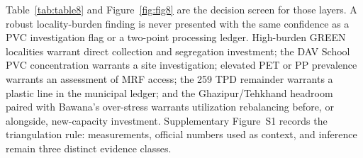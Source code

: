 \documentclass[12pt,a4paper]{article}
\begin{document}
Table~\ref{tab:table8} and Figure~\ref{fig:fig8} are the decision screen for those layers. A robust locality-burden finding is never presented with the same confidence as a PVC investigation flag or a two-point processing ledger. High-burden GREEN localities warrant direct collection and segregation investment; the DAV School PVC concentration warrants a site investigation; elevated PET or PP prevalence warrants an assessment of MRF access; the 259 TPD remainder warrants a plastic line in the municipal ledger; and the Ghazipur/Tehkhand headroom paired with Bawana's over-stress warrants utilization rebalancing before, or alongside, new-capacity investment. Supplementary Figure~S1 records the triangulation rule: measurements, official numbers used as context, and inference remain three distinct evidence classes.
\end{document}
